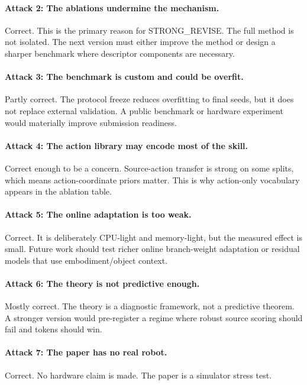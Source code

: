 \documentclass{article}
\begin{document}
\paragraph{Attack 2: The ablations undermine the mechanism.}
Correct. This is the primary reason for STRONG\_REVISE. The full method is not isolated. The next version must either improve the method or design a sharper benchmark where descriptor components are necessary.

\paragraph{Attack 3: The benchmark is custom and could be overfit.}
Partly correct. The protocol freeze reduces overfitting to final seeds, but it does not replace external validation. A public benchmark or hardware experiment would materially improve submission readiness.

\paragraph{Attack 4: The action library may encode most of the skill.}
Correct enough to be a concern. Source-action transfer is strong on some splits, which means action-coordinate priors matter. This is why action-only vocabulary appears in the ablation table.

\paragraph{Attack 5: The online adaptation is too weak.}
Correct. It is deliberately CPU-light and memory-light, but the measured effect is small. Future work should test richer online branch-weight adaptation or residual models that use embodiment/object context.

\paragraph{Attack 6: The theory is not predictive enough.}
Mostly correct. The theory is a diagnostic framework, not a predictive theorem. A stronger version would pre-register a regime where robust source scoring should fail and tokens should win.

\paragraph{Attack 7: The paper has no real robot.}
Correct. No hardware claim is made. The paper is a simulator stress test.
\end{document}
